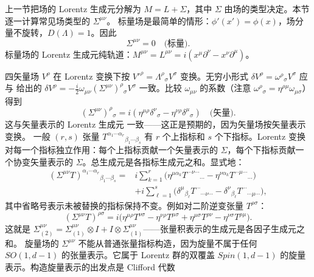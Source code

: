 上一节把场的 Lorentz 生成元分解为 $M=L+\Sigma$，其中 $\Sigma$ 由场的类型决定。本节逐一计算常见场类型的 $\Sigma^{\mu\nu}$。
标量场是最简单的情形：$\phi'(x')=\phi(x)$，场分量不旋转，$D(\Lambda)=1$。因此
\begin{equation*}
\boxed{\Sigma^{\mu\nu}=0\quad\text{(标量)}.}
\end{equation*}
标量场的 Lorentz 生成元纯轨道：$M^{\mu\nu}=L^{\mu\nu}=i(x^\mu\partial^\nu-x^\nu\partial^\mu)$。

四矢量场 $V^\rho$ 在 Lorentz 变换下按 $V'^\rho=\Lambda^\rho{}_\sigma V^\sigma$ 变换。无穷小形式 $\delta V^\rho=\omega^\rho{}_\sigma V^\sigma$ 应与 给出的 $\delta V^\rho=-\frac{i}{2}\omega_{\mu\nu}(\Sigma^{\mu\nu})^\rho{}_\sigma V^\sigma$ 一致。比较 $\omega_{\mu\nu}$ 的系数（注意 $\omega^\rho{}_\sigma=\eta^{\rho\mu}\omega_{\mu\sigma}$）得到
\begin{equation*}\boxed{
(\Sigma^{\mu\nu})^\rho{}_\sigma=i(\eta^{\mu\rho}\delta^\nu{}_\sigma-\eta^{\nu\rho}\delta^\mu{}_\sigma)\quad\text{(矢量)}.
}
\end{equation*}
这与矢量表示的 Lorentz 生成元 一致——这正是预期的，因为矢量场按矢量表示变换。
一般 $(r,s)$ 张量 $T^{\alpha_1\cdots\alpha_r}{}_{\beta_1\cdots\beta_s}$ 有 $r$ 个上指标和 $s$ 个下指标。Lorentz 变换对每一个指标独立作用：每个上指标贡献一个矢量表示的 $\Sigma$，每个下指标贡献一个协变矢量表示的 $\Sigma$。总生成元是各指标生成元之和。显式地：
\begin{equation*}\boxed{
\begin{aligned}
(\Sigma^{\mu\nu}T)^{\alpha_1\cdots\alpha_r}{}_{\beta_1\cdots\beta_s}
={}&i\sum_{k=1}^{r}\Big(\eta^{\mu\alpha_k}T^{\cdots\nu\cdots}{}_{\cdots}-\eta^{\nu\alpha_k}T^{\cdots\mu\cdots}{}_{\cdots}\Big)\\
&+i\sum_{\ell=1}^{s}\Big(\delta^\mu{}_{\beta_\ell}T^{\cdots}{}_{\cdots\nu\cdots}-\delta^\nu{}_{\beta_\ell}T^{\cdots}{}_{\cdots\mu\cdots}\Big),
\end{aligned}
}
\end{equation*}
其中省略号表示未被替换的指标保持不变。例如对二阶逆变张量 $T^{\rho\sigma}$：
\begin{equation*}
(\Sigma^{\mu\nu}T)^{\rho\sigma}=i\big(\eta^{\mu\rho}T^{\nu\sigma}-\eta^{\nu\rho}T^{\mu\sigma}+\eta^{\mu\sigma}T^{\rho\nu}-\eta^{\nu\sigma}T^{\rho\mu}\big).
\end{equation*}
这就是 $\Sigma^{\mu\nu}_{(2)}=\Sigma^{\mu\nu}_{(1)}\otimes I+I\otimes\Sigma^{\mu\nu}_{(1)}$——张量积表示的生成元是各因子生成元之和。
旋量场的 $\Sigma^{\mu\nu}$ 不能从普通张量指标构造，因为旋量不属于任何 $SO(1,d-1)$ 的张量表示。它属于 Lorentz 群的双覆盖 $Spin(1,d-1)$ 的旋量表示。构造旋量表示的出发点是 Clifford 代数

